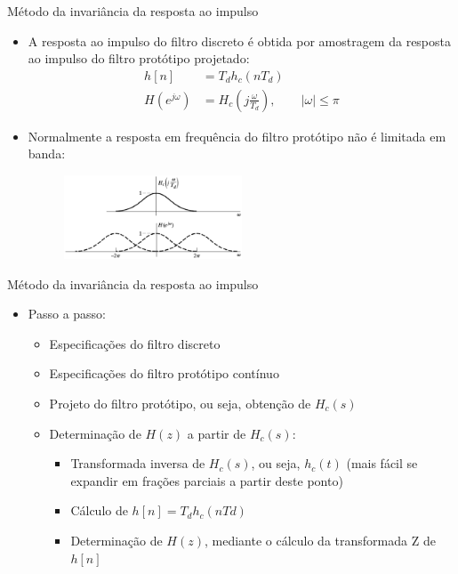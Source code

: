 \begin{slide}{Método da invariância da resposta ao impulso}
	\begin{itemize}
		\item A resposta ao impulso do filtro discreto é obtida por amostragem da resposta ao impulso do filtro protótipo projetado:
			\begin{align*}
				h[n] &= T_dh_c(nT_d)\\
				H(e^{j\omega}) &= H_c\left( j\frac{\omega}{T_d}\right ), \qquad |\omega|\leq \pi
			\end{align*}
		\item Normalmente a resposta em frequência do filtro protótipo não é limitada em banda:
			\begin{figure}
				\includegraphics[width = 0.5\textwidth]{figs/impulse-invariance.eps}
			\end{figure}
	\end{itemize}
\end{slide}

\begin{slide}{Método da invariância da resposta ao impulso}
	\begin{itemize}
		\item Passo a passo:
		\begin{itemize}
			\item Especificações do filtro discreto
			\item Especificações do filtro protótipo contínuo
			\item Projeto do filtro protótipo, ou seja, obtenção de $H_c(s)$
			\item Determinação de $H(z)$ a partir de $H_c(s)$:
			\begin{itemize}
				\item Transformada inversa de $H_c(s)$, ou seja, $h_c(t)$ (mais fácil se expandir em frações parciais a partir deste ponto)
				\item Cálculo de $h[n] = T_dh_c(nTd)$
				\item Determinação de $H(z)$, mediante o cálculo da transformada Z de $h[n]$
			\end{itemize}
		\end{itemize}
	\end{itemize}
\end{slide}


